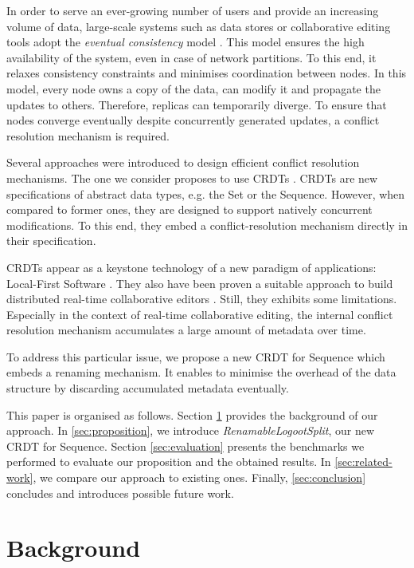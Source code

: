 \documentclass[sigplan,10pt]{acmart}
\begin{document}
In order to serve an ever-growing number of users and provide an increasing volume of data, large-scale systems such as data stores or collaborative editing tools adopt the \emph{eventual consistency} model \cite{10.1145/224057.224070}.
This model ensures the high availability of the system, even in case of network partitions.
To this end, it relaxes consistency constraints and minimises coordination between nodes.
In this model, every node owns a copy of the data, can modify it and propagate the updates to others.
Therefore, replicas can temporarily diverge.
To ensure that nodes converge eventually despite concurrently generated updates, a conflict resolution mechanism is required.

Several approaches were introduced to design efficient conflict resolution mechanisms.
The one we consider proposes to use \acfp{CRDT} \cite{shapiro_2011_crdt}.
\acp{CRDT} are new specifications of abstract data types, e.g. the Set or the Sequence.
However, when compared to former ones, they are designed to support natively concurrent modifications.
To this end, they embed a conflict-resolution mechanism directly in their specification.

\acp{CRDT} appear as a keystone technology of a new paradigm of applications: Local-First Software \cite{10.1145/3359591.3359737}.
They also have been proven a suitable approach to build distributed real-time collaborative editors \cite{doi:10.1002/cpe.4108}.
Still, they exhibits some limitations.
Especially in the context of real-time collaborative editing, the internal conflict resolution mechanism accumulates a large amount of metadata over time.

To address this particular issue, we propose a new \ac{CRDT} for Sequence which embeds a renaming mechanism.
It enables to minimise the overhead of the data structure by discarding accumulated metadata eventually.

This paper is organised as follows.
Section \ref{sec:background} provides the background of our approach.
In \autoref{sec:proposition}, we introduce \emph{RenamableLogootSplit}, our new \ac{CRDT} for Sequence.
Section \ref{sec:evaluation} presents the benchmarks we performed to evaluate our proposition and the obtained results.
In \autoref{sec:related-work}, we compare our approach to existing ones.
Finally, \autoref{sec:conclusion} concludes and introduces possible future work.

\section{Background}
\label{sec:background}
\end{document}
